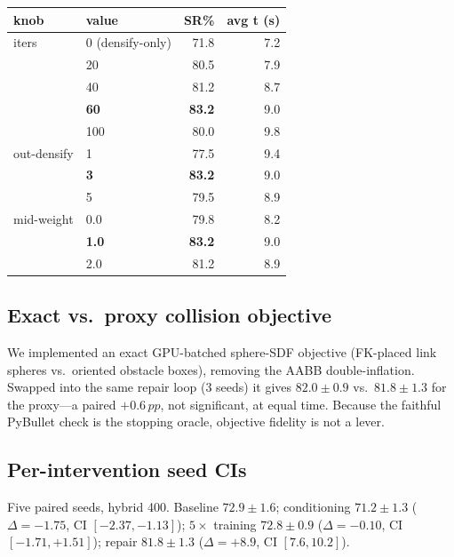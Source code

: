 \documentclass[10pt,twocolumn]{article}
\newcommand{\pp}{\,pp}
\begin{document}
\begin{center}\small
\begin{tabular}{llrr}
\toprule
knob & value & SR\% & avg t (s) \\
\midrule
iters & 0 (densify-only) & 71.8 & 7.2 \\
      & 20 & 80.5 & 7.9 \\
      & 40 & 81.2 & 8.7 \\
      & \textbf{60} & \textbf{83.2} & 9.0 \\
      & 100 & 80.0 & 9.8 \\
\midrule
out-densify & 1 & 77.5 & 9.4 \\
            & \textbf{3} & \textbf{83.2} & 9.0 \\
            & 5 & 79.5 & 8.9 \\
\midrule
mid-weight & 0.0 & 79.8 & 8.2 \\
           & \textbf{1.0} & \textbf{83.2} & 9.0 \\
           & 2.0 & 81.2 & 8.9 \\
\bottomrule
\end{tabular}
\end{center}

\subsection{Exact vs.\ proxy collision objective}
\label{app:sphere}
We implemented an exact GPU-batched sphere-SDF objective (FK-placed link spheres
vs.\ oriented obstacle boxes), removing the AABB double-inflation. Swapped into the
same repair loop (3 seeds) it gives $82.0{\pm}0.9$ vs.\ $81.8{\pm}1.3$ for the
proxy---a paired $+0.6\pp$, not significant, at equal time. Because the faithful
PyBullet check is the stopping oracle, objective fidelity is not a lever.

\subsection{Per-intervention seed CIs}
\label{app:seeds}
Five paired seeds, hybrid 400. Baseline $72.9{\pm}1.6$; conditioning
$71.2{\pm}1.3$ ($\Delta{=}{-}1.75$, CI $[-2.37,-1.13]$); $5\times$ training
$72.8{\pm}0.9$ ($\Delta{=}{-}0.10$, CI $[-1.71,+1.51]$); repair $81.8{\pm}1.3$
($\Delta{=}{+}8.9$, CI $[7.6,10.2]$).
\end{document}
